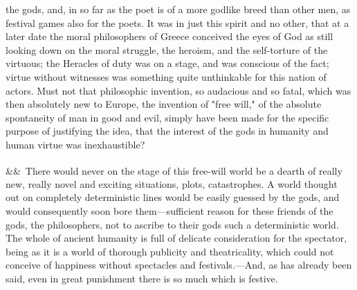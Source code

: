 \documentclass[12pt]{article}
\newcommand{\para}[1][]{\par\noindent\ifx&#1&\else\textsuperscript{\footnotesize #1}~\fi}
\begin{document}
the gods, and, in so far as the poet is of a more godlike breed than other men, as festival games also for the poets. It was in just this spirit and no other, that at a later date the moral philosophers of Greece conceived the eyes of God as still looking down on the moral struggle, the heroism, and the self-torture of the virtuous; the Heracles of duty was on a stage, and was conscious of the fact; virtue without witnesses was something quite unthinkable for this nation of actors. Must not that philosophic invention, so audacious and so fatal, which was then absolutely new to Europe, the invention of "free will," of the absolute spontaneity of man in good and evil, simply have been made for the specific purpose of justifying the idea, that the interest of the gods in humanity and human virtue was inexhaustible?

\para There would never on the stage of this free-will world be a dearth of really new, really novel and exciting situations, plots, catastrophes. A world thought out on completely deterministic lines would be easily guessed by the gods, and would consequently soon bore them---sufficient reason for these friends of the gods, the philosophers, not to ascribe to their gods such a deterministic world. The whole of ancient humanity is full of delicate consideration for the spectator, being as it is a world of thorough publicity and theatricality, which could not conceive of happiness without spectacles and festivals.---And, as has already been said, even in great punishment there is so much which is festive.
\end{document}
